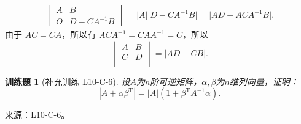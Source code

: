 \documentclass[12pt,fontset=fandol]{ctexart}
\newtheorem{exercise}{训练题}[section]
\begin{document}
\begin{solve}
\begin{align*}
\begin{vmatrix}
                            A & B          \\
                            O & D-CA^{-1}B
                        \end{vmatrix}
                = \lvert A \rvert \lvert D-CA^{-1}B \rvert = \lvert AD-ACA^{-1}B \rvert.
            \end{align*} 由于 $AC = CA$，所以有 $ACA^{-1} = CAA^{-1} = C$，所以
            \[\begin{vmatrix}
                    A & B \\
                    C & D \\
                \end{vmatrix} = \lvert AD-CB \rvert.\]
\end{solve}

\begin{exercise}[补充训练 L10-C-6]\label{prob:L10-C-6}
设$A$为$n$阶可逆矩阵，$\alpha,\beta$为$n$维列向量，证明：
        \[|A+\alpha\beta^{\mathrm{T}}|=|A|(1+\beta^\mathrm{T}A^{-1}\alpha).\]
\end{exercise}
\noindent 来源：\href{https://github.com/yhwu-is/Linear-Algebra-Left-Undone/blob/new/%E8%AE%B2%E4%B9%89/%E4%B8%93%E9%A2%98/10%20%E8%A1%8C%E5%88%97%E5%BC%8F.tex}{L10-C-6}。
\end{document}
